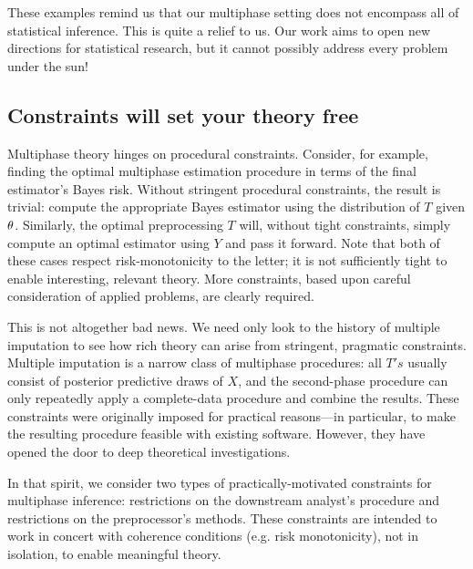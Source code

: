 These examples remind us that our multiphase setting does not encompass all of statistical inference.
This is quite a relief to us.
Our work aims to open new directions for statistical research, but it cannot possibly address every problem under the sun!

\subsection{Constraints will set your theory free}
\label{multiphase:sec:constraints}

Multiphase theory hinges on procedural constraints.
Consider, for example, finding the optimal multiphase estimation procedure in terms of the final estimator's Bayes risk.
Without stringent procedural constraints, the result is trivial: compute the appropriate Bayes estimator using the distribution of $T$ given $\theta$.
Similarly, the optimal preprocessing $T$ will, without tight constraints, simply compute an optimal estimator using $Y$ and pass it forward.
Note that both of these cases respect risk-monotonicity to the letter; it is not sufficiently tight to enable interesting, relevant theory.
More constraints, based upon careful consideration of applied problems, are clearly required.

This is not altogether bad news.
We need only look to the history of multiple imputation to see how rich theory can arise from stringent, pragmatic constraints.
Multiple imputation is a narrow class of multiphase procedures: all $T's$ usually consist of posterior predictive draws of $X$, and the second-phase procedure can only repeatedly apply a complete-data procedure and combine the results.
These constraints were originally imposed for practical reasons---in particular, to make the resulting procedure feasible with existing software.
However, they have opened the door to deep theoretical investigations.

In that spirit, we consider two types of practically-motivated constraints for multiphase inference: restrictions on the downstream analyst's procedure and restrictions on the preprocessor's methods.
These constraints are intended to work in concert with coherence conditions (e.g. risk monotonicity), not in isolation, to enable meaningful theory.

